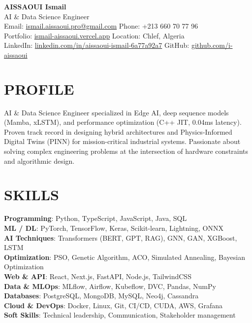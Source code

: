 \documentclass[a4paper,12pt]{article}
\begin{document}
\begin{center}
    {\Huge\bfseries\color{titleblue} AISSAOUI Ismail}\\[4pt]
    {\Large AI \& Data Science Engineer}\\[6pt]

    {\normalsize
    Email: \href{mailto:ismail.aissaoui.pro@gmail.com}{ismail.aissaoui.pro@gmail.com} \quad
    Phone: +213 660 70 77 96 \\
    Portfolio: \href{https://ismail-aissaoui.vercel.app}{ismail-aissaoui.vercel.app} \quad
    Location: Chlef, Algeria \\
    LinkedIn: \href{https://linkedin.com/in/aissaoui-ismail-6a77a92a7}{linkedin.com/in/aissaoui-ismail-6a77a92a7} \quad
    GitHub: \href{https://github.com/i-aissaoui}{github.com/i-aissaoui}
    }
\end{center}

\section{PROFILE}
AI \& Data Science Engineer specialized in Edge AI, deep sequence models (Mamba, xLSTM), and performance optimization (C++ JIT, 0.04ms latency). Proven track record in designing hybrid architectures and Physics-Informed Digital Twins (PINN) for mission-critical industrial systems. Passionate about solving complex engineering problems at the intersection of hardware constraints and algorithmic design.

\section{SKILLS}
\setlength{\parskip}{-1pt}
{\normalsize
\textbf{Programming}: Python, TypeScript, JavaScript, Java, SQL \\
\textbf{ML / DL}: PyTorch, TensorFlow, Keras, Scikit-learn, Lightning, ONNX \\
\textbf{AI Techniques}: Transformers (BERT, GPT, RAG), GNN, GAN, XGBoost, LSTM \\
\textbf{Optimization}: PSO, Genetic Algorithm, ACO, Simulated Annealing, Bayesian Optimization \\
\textbf{Web \& API}: React, Next.js, FastAPI, Node.js, TailwindCSS \\
\textbf{Data \& MLOps}: MLflow, Airflow, Kubeflow, DVC, Pandas, NumPy \\
\textbf{Databases}: PostgreSQL, MongoDB, MySQL, Neo4j, Cassandra \\
\textbf{Cloud \& DevOps}: Docker, Linux, Git, CI/CD, CUDA, AWS, Grafana \\
\textbf{Soft Skills}: Technical leadership, Communication, Stakeholder management
}
\end{document}
